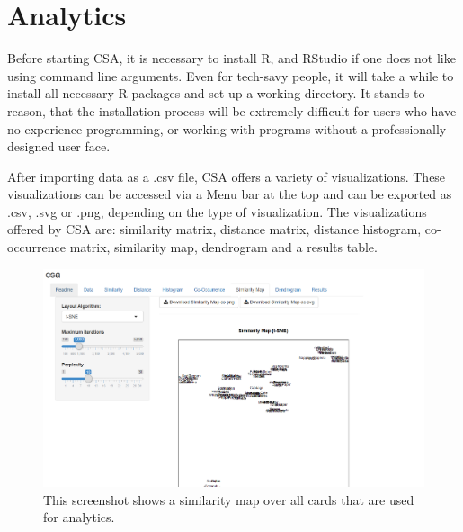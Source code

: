 \section{Analytics}

Before starting CSA, it is necessary to install R, and RStudio if one does not 
like using command line arguments. Even for tech-savy people, it will take a 
while to install all necessary R packages and set up a working directory. It 
stands to reason, that the installation process will be extremely difficult for 
users who have no experience programming, or working with programs without a 
professionally designed user face.

After importing data as a .csv file, CSA offers a variety of visualizations. 
These visualizations can be accessed via a Menu bar at the top and can be 
exported as .csv, .svg or .png, depending on the type of visualization. The 
visualizations offered by CSA are: similarity matrix, distance matrix, distance 
histogram, co-occurrence matrix, similarity map, dendrogram and a results 
table. 


\begin{figure}[tp] 
\centering
\includegraphics[keepaspectratio,width=\linewidth,height=\halfh]{images/csa-similarity.png}
\caption[CSA Similarity Map] { This screenshot shows a similarity map over
all cards that are used for analytics.
 }
\label{fig:CSA2}
\end{figure}

